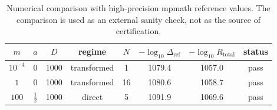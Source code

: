 \begin{table}[t]
\centering
\small
\begin{tabular}{c c c c c c c c}
\hline
$m$ & $a$ & $D$ & regime & $N$ & $-\log_{10}\Delta_{\mathrm{ref}}$ & $-\log_{10}R_{\mathrm{total}}$ & status \\
\hline
$10^{-4}$ & $0$ & 1000 & transformed & 1 & 1079.4 & 1057.0 & pass \\
$1$ & $0$ & 1000 & transformed & 16 & 1080.6 & 1058.7 & pass \\
$100$ & $\frac12$ & 1000 & direct & 5 & 1091.9 & 1069.6 & pass \\
\hline
\end{tabular}
\caption{Numerical comparison with high-precision mpmath reference values. The comparison is used as an external sanity check, not as the source of certification.}
\label{tab:reference-comparison}
\end{table}
